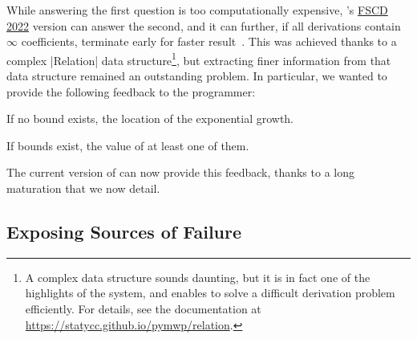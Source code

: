 \documentclass[runningheads]{llncs}
\begin{document}
While answering the first question is too computationally expensive, \pymwp's \href{https://github.com/statycc/pymwp/releases/tag/FSCD22}{\vtag  FSCD 2022} version can answer the second, and it can further, if all derivations contain \(\infty\) coefficients, terminate early for faster result~\cite[Sect.~4.4]{Aubert2022b}.
This was achieved thanks to a complex \pr|Relation| data structure\footnote{
A complex data structure sounds daunting, but it is in fact one of the highlights of the system, and enables to solve a difficult derivation problem efficiently. For details, see the documentation at \url{https://statycc.github.io/pymwp/relation}.}, but extracting finer information from that data structure remained an outstanding problem.
%
%
In particular, we wanted to provide the following feedback to the programmer:
\begin{enumerate*}[label=(\roman*)]
\item If no bound exists, the location of the exponential growth.
\item If bounds exist, the value of at least one of them.
\end{enumerate*}
The current version of \pymwp can now provide this feedback, thanks to a long maturation that we now detail.

\subsection{Exposing Sources of Failure}
\label{subsec:fail}
\end{document}
